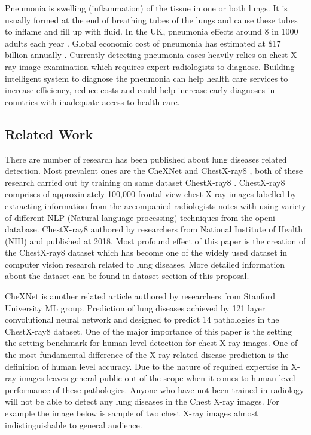 \documentclass[12pt, twoside, a4paper]{article}
\begin{document}
Pneumonia is swelling (inflammation) of the tissue in one or both lungs. It is usually formed at the end of breathing tubes of the lungs and cause these tubes to inflame and fill up with fluid. In the UK, pneumonia effects around 8 in 1000 adults each year \cite{nhs}. Global economic cost of pneumonia has estimated at \$17 billion annually \cite{cost}. Currently detecting pneumonia cases heavily relies on chest X-ray image examination which requires expert radiologists to diagnose. Building intelligent system to diagnose the pneumonia can help  health care services to increase efficiency, reduce costs and could help increase early diagnoses in countries with inadequate access to health care.

\subsection{Related Work}

There are number of research has been published about lung diseases related detection. Most prevalent ones are the CheXNet \cite{CheXNetRP} and ChestX-ray8 \cite{ChestX-ray8}, both of these research carried out by training on same dataset ChestX-ray8 \cite{ChestX-ray8}. ChestX-ray8 comprises of approximately 100,000 frontal view chest X-ray images labelled by extracting information from the accompanied radiologists notes with using variety of different NLP (Natural language processing) techniques from the openi\cite{openi} database. ChestX-ray8 authored by researchers from National Institute of Health (NIH) and published at 2018.
Most profound effect of this paper is the creation of the ChestX-ray8 dataset which has become one of the widely used dataset in computer vision research related to lung diseases. More detailed information about the dataset can be found in dataset section of this proposal. 

CheXNet is another related article authored by researchers from Stanford University ML group. Prediction of lung diseases achieved by 121 layer convolutional neural network and designed to predict 14 pathologies in the ChestX-ray8 dataset. One of the major importance of this paper is the setting the setting benchmark for human level detection for chest X-ray images. One of the most fundamental difference of the X-ray related disease prediction is the definition of human level accuracy. Due to the nature of required expertise in X-ray images leaves general public out of the scope when it comes to human level performance of these pathologies. Anyone who have not been trained in radiology will not be able to detect any lung diseases in the Chest X-ray images. For example the image below is sample of two chest X-ray images almost indistinguishable to general audience.
\end{document}
